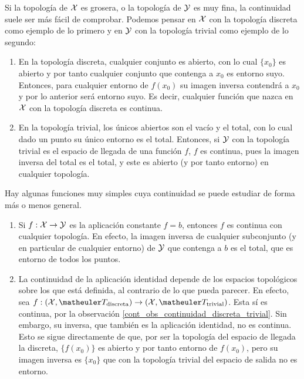 \begin{obs}
	\label{cont_obs_continuidad_discreta_trivial}
	Si la topología de $\mathcal{X}$ es grosera, o la topología de $\mathcal{Y}$ es muy fina, la continuidad suele ser más fácil de comprobar. Podemos pensar en $\mathcal{X}$ con la topología discreta como ejemplo de lo primero y en $\mathcal{Y}$ con la topología trivial como ejemplo de lo segundo:
	
	\begin{enumerate}
		\item En la topología discreta, cualquier conjunto es abierto, con lo cual $\{x_0\}$ es abierto y por tanto cualquier conjunto que contenga a $x_0$ es entorno suyo. Entonces, para cualquier entorno de $f(x_0)$ su imagen inversa contendrá a $x_0$ y por lo anterior será entorno suyo. Es decir, cualquier función que nazca en $\mathcal{X}$ con la topología discreta es continua.
		
		\item En la topología trivial, los únicos abiertos son el vacío y el total, con lo cual dado un punto su único entorno es el total. Entonces, si $\mathcal{Y}$ con la topología trivial es el espacio de llegada de una función $f$, $f$ es continua, pues la imagen inversa del total es el total, y este es abierto (y por tanto entorno) en cualquier topología. \qedhere 
	\end{enumerate}
\end{obs}

\begin{obs}
	Hay algunas funciones muy simples cuya continuidad se puede estudiar de forma más o menos general.
	
	\begin{enumerate}
		\item Si $f:\mathcal{X}\to\mathcal{Y}$ es la aplicación constante $f=b$, entonces $f$ es continua con cualquier topología. En efecto, la imagen inversa de cualquier subconjunto (y en particular de cualquier entorno) de $\mathcal{Y}$ que contenga a $b$ es el total, que es entorno de todos los puntos.
		
		\item La continuidad de la aplicación identidad depende de los espacios topológicos sobre los que está definida, al contrario de lo que pueda parecer. En efecto, sea $f:(\X,\T_\text{discreta})\to (\X,\T_\text{trivial})$. Esta sí es continua, por la observación \ref{cont_obs_continuidad_discreta_trivial}. Sin embargo, su inversa, que también es la aplicación identidad, no es continua. Esto se sigue directamente de que, por ser la topología del espacio de llegada la discreta, $\{f(x_0)\}$ es abierto y por tanto entorno de $f(x_0)$, pero su imagen inversa es $\{x_0\}$ que con la topología trivial del espacio de salida no es entorno.
	\end{enumerate}
\end{obs}

